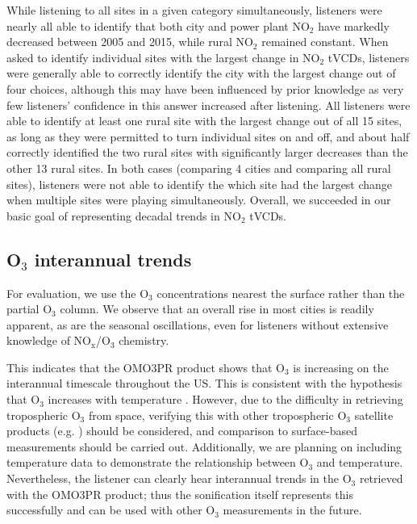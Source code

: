 \documentclass[a4paper,10pt,oneside]{article}
\newcommand{\ce}[1]{$\mathrm{#1}$}
\begin{document}
\begin{sloppy}
While listening to all sites in a given category simultaneously, listeners were nearly all able to identify that both city and power plant \ce{NO_2} have markedly decreased between 2005 and 2015, while rural \ce{NO_2} remained constant. When asked to identify individual sites with the largest change in \ce{NO_2} tVCDs, listeners were generally able to correctly identify the city with the largest change out of four choices, although this may have been influenced by prior knowledge as very few listeners' confidence in this answer increased after listening. All listeners were able to identify at least one rural site with the largest change out of all 15 sites, as long as they were permitted to turn individual sites on and off, and about half correctly identified the two rural sites with significantly larger decreases than the other 13 rural sites. In both cases (comparing 4 cities and comparing all rural sites), listeners were not able to identify the which site had the largest change when multiple sites were playing simultaneously.  Overall, we succeeded in our basic goal of representing decadal trends in \ce{NO_2} tVCDs.

\subsection{O$_3$ interannual trends}
For evaluation, we use the \ce{O_3} concentrations nearest the surface rather than the partial \ce{O_3} column.  We observe that an overall rise in most cities is readily apparent, as are the seasonal oscillations, even for listeners without extensive knowledge of \ce{NO_x}/\ce{O_3} chemistry.

This indicates that the OMO3PR product shows that \ce{O_3} is increasing on the interannual timescale throughout the US. This is consistent with the hypothesis that \ce{O_3} increases with temperature \cite{lin17}. However, due to the difficulty in retrieving tropospheric \ce{O_3} from space, verifying this with other tropospheric \ce{O_3} satellite products (e.g. \cite{choi08}) should be considered, and comparison to surface-based measurements should be carried out. Additionally, we are planning on including temperature data to demonstrate the relationship between \ce{O_3} and temperature.  Nevertheless, the listener can clearly hear interannual trends in the \ce{O_3} retrieved with the OMO3PR product; thus the sonification itself represents this successfully and can be used with other \ce{O_3} measurements in the future.


\end{sloppy}
\end{document}
